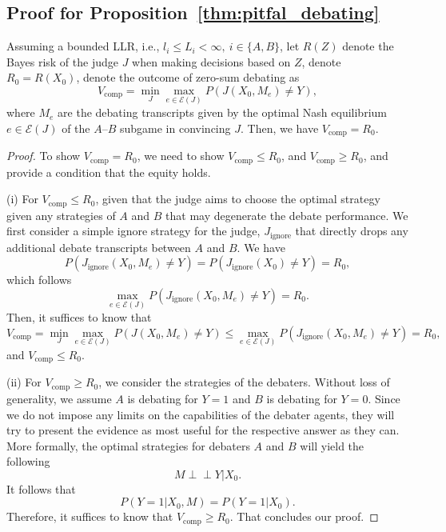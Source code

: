 \documentclass{article} %
\begin{document}
\subsection{Proof for Proposition~\ref{thm:pitfal_debating}}
\label{proof:pitfal_debating}
\begin{proposition}%
    Assuming a bounded LLR, i.e., $l_i\leq L_i<\infty,\ i\in\{A,B\}$, let $R(Z)$ denote the Bayes risk of the judge $J$ when making decisions based on $Z$, denote $R_0=R(X_0)$, denote the outcome of zero-sum debating as
    \[
    V_\mathrm{comp}=\min_J\max_{e\in\mathcal{E}(J)} P(J(X_0,M_e)\neq Y),
    \]
    where $M_e$ are the debating transcripts given by the optimal Nash equilibrium $e\in\mathcal{E}(J)$ of the $A$–$B$ subgame in convincing $J$.
    Then, we have $V_\textrm{comp}=R_0$.
\end{proposition}
\begin{proof}
    To show $V_\textrm{comp}=R_0$, we need to show $V_\textrm{comp}\leq R_0$, and $V_\textrm{comp}\geq R_0$, and provide a condition that the equity holds. 

    (i) For $V_\textrm{comp}\leq R_0$, given that the judge aims to choose the optimal strategy given any strategies of $A$ and $B$ that may degenerate the debate performance. We first consider a simple ignore strategy for the judge, $J_\mathrm{ignore}$ that directly drops any additional debate transcripts between $A$ and $B$. We have
    \begin{equation}
        P(J_\mathrm{ignore}(X_0,M_e)\neq Y)=P(J_\mathrm{ignore}(X_0)\neq Y)=R_0,
    \end{equation}
    which follows
    \begin{equation}
        \max_{e\in\mathcal{E}(J)}P(J_\mathrm{ignore}(X_0,M_e)\neq Y)=R_0.
    \end{equation}
    Then, it suffices to know that
    \begin{equation}
        V_\mathrm{comp}=\min_J\max_{e\in\mathcal{E}(J)} P(J(X_0,M_e)\neq Y)\leq \max_{e\in\mathcal{E}(J)}P(J_\mathrm{ignore}(X_0,M_e)\neq Y)=R_0,
    \end{equation}
    and $V_\textrm{comp}\leq R_0$.

    (ii) For $V_\textrm{comp}\geq R_0$, we consider the strategies of the debaters. Without loss of generality, we assume $A$ is debating for $Y=1$ and $B$ is debating for $Y=0$. Since we do not impose any limits on the capabilities of the debater agents, they will try to present the evidence as most useful for the respective answer as they can. More formally, the optimal strategies for debaters $A$ and $B$ will yield the following
    \begin{equation}
        M\mathrel{\perp\!\!\!\perp} Y |X_0.
    \end{equation}
    It follows that
    \begin{equation}
        P(Y=1|X_0,M)=P(Y=1|X_0).
    \end{equation}
    Therefore, it suffices to know that $V_\textrm{comp}\geq R_0$. That concludes our proof.
\end{proof}
\end{document}

